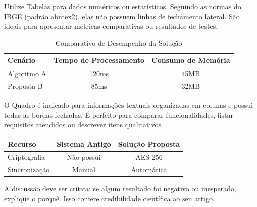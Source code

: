 Utilize Tabelas para dados numéricos ou estatísticos. Seguindo as normas do IBGE
(padrão abntex2), elas não possuem linhas de fechamento lateral. São ideais para
apresentar métricas comparativas ou resultados de testes.

\begin{table}[htb]
    \centering
    \ABNTEXfontereduzida
    \begin{minipage}{0.6\textwidth}
        \caption{Comparativo de Desempenho da Solução}
        \label{tab:resultados-testes}
        \begin{tabular}{lcc}
            \toprule
            \textbf{Cenário} & \textbf{Tempo de Processamento} & \textbf{Consumo de Memória} \\
            \midrule
            Algoritmo A & 120ms & 45MB \\
            Proposta B & 85ms & 32MB \\
            \bottomrule
        \end{tabular}
    \end{minipage}
\end{table}

O Quadro é indicado para informações textuais organizadas em colunas e possui 
todas as bordas fechadas. É perfeito para comparar funcionalidades, listar 
requisitos atendidos ou descrever itens qualitativos.

\begin{quadro}[htb]
    \centering
    \begin{minipage}{0.6\textwidth}
        \caption{\label{qdr:comparativo}Comparativo Qualitativo de Funcionalidades}
        \begin{tabular}{|l|c|c|}
            \hline
            \textbf{Recurso} & \textbf{Sistema Antigo} & \textbf{Solução Proposta} \\
            \hline
            Criptografia & Não possui & AES-256 \\
            \hline
            Sincronização & Manual & Automática \\
            \hline
        \end{tabular}
    \end{minipage}
\end{quadro}

A discussão deve ser crítica: se algum resultado foi negativo ou inesperado,
explique o porquê. Isso confere credibilidade científica ao seu artigo.